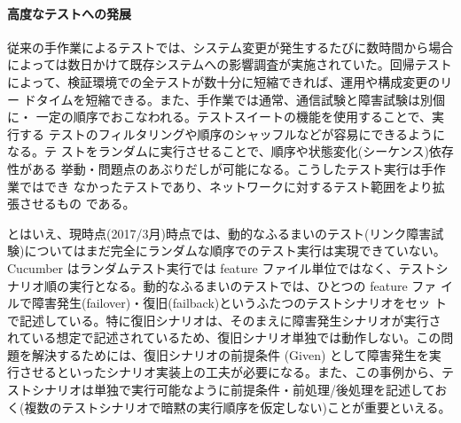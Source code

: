     \paragraph{高度なテストへの発展}
従来の手作業によるテストでは、システム変更が発生するたびに数時間から場合
によっては数日かけて既存システムへの影響調査が実施されていた。回帰テスト
によって、検証環境での全テストが数十分に短縮できれば、運用や構成変更のリー
ドタイムを短縮できる。また、手作業では通常、通信試験と障害試験は別個に・
一定の順序でおこなわれる。テストスイートの機能を使用することで、実行する
テストのフィルタリングや順序のシャッフルなどが容易にできるようになる。テ
ストをランダムに実行させることで、順序や状態変化(シーケンス)依存性がある
挙動・問題点のあぶりだしが可能になる。こうしたテスト実行は手作業ではでき
なかったテストであり、ネットワークに対するテスト範囲をより拡張させるもの
である。

とはいえ、現時点(2017/3月)時点では、動的なふるまいのテスト(リンク障害試
験)についてはまだ完全にランダムな順序でのテスト実行は実現できていない。
Cucumber はランダムテスト実行では feature ファイル単位ではなく、テストシ
ナリオ順の実行となる。動的なふるまいのテストでは、ひとつの feature ファ
イルで障害発生(failover)・復旧(failback)というふたつのテストシナリオをセッ
トで記述している。特に復旧シナリオは、そのまえに障害発生シナリオが実行さ
れている想定で記述されているため、復旧シナリオ単独では動作しない。この問
題を解決するためには、復旧シナリオの前提条件 (Given) として障害発生を実
行させるといったシナリオ実装上の工夫が必要になる。また、この事例から、テ
ストシナリオは単独で実行可能なように前提条件・前処理/後処理を記述してお
く(複数のテストシナリオで暗黙の実行順序を仮定しない)ことが重要といえる。

